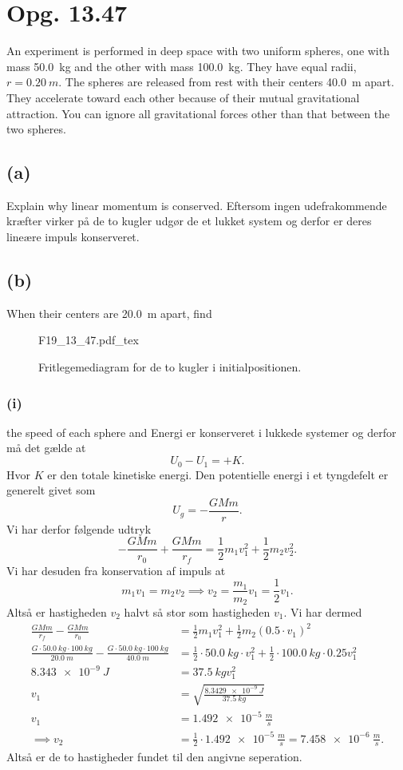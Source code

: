 \documentclass[12pt]{article}
\newcommand{\incfig}[2][1]{%
  \def\svgwidth{#1\columnwidth}
  {#2.pdf_tex}
}
\theoremstyle{definition}
\begin{document}
\section*{Opg. 13.47}
An experiment is performed in deep space with two uniform spheres, one with mass \qty{50,0}{kg} and the other with mass \qty{100,0}{kg}. They have equal radii, $r = \qty{0,20}{m}$. The spheres are released from rest with their centers \qty{40,0}{m} apart. They accelerate toward each other because of their mutual gravitational attraction. You can ignore all gravitational forces other than that between the two spheres.

\subsection*{(a)}
Explain why linear momentum is conserved.
\bigbreak
Eftersom ingen udefrakommende kræfter virker på de to kugler udgør de et lukket system og derfor er deres lineære impuls konserveret. 

\subsection*{(b)}
When their centers are \qty{20,0}{m} apart, find

\begin{figure}[ht]
  \centering
  \incfig[0.8]{F19_13_47}
  \caption{Fritlegemediagram for de to kugler i initialpositionen.}
  \label{fig:F19_13_47}
\end{figure}

\subsubsection*{(i)}
the speed of each sphere and
\bigbreak
Energi er konserveret i lukkede systemer og derfor må det gælde at
\[ 
  U_0 - U_1 = + K
.\]
Hvor $K$ er den totale kinetiske energi. Den potentielle energi i et tyngdefelt er generelt givet som
\[ 
  U_g = - \frac{GMm}{r}
.\]
Vi har derfor følgende udtryk
\[ 
  - \frac{GMm}{r_0} + \frac{GMm}{r_f} = \frac{1}{2}m_1 v_1^2 + \frac{1}{2} m_2 v_2^2
.\]
Vi har desuden fra konservation af impuls at
\[ 
m_1v_1 = m_2v_2 \implies v_2 = \frac{m_1}{m_2}v_1 = \frac{1}{2}v_1
.\]
Altså er hastigheden $v_2$ halvt så stor som hastigheden $v_1$. Vi har dermed
\begin{align*}
  \frac{GMm}{r_f} - \frac{GMm}{r_0} &= \frac{1}{2}m_1 v_1^2 + \frac{1}{2} m_2 (\num{0,5} \cdot  v_1)^2 \\
  \frac{G \cdot \qty{50,0}{kg} \cdot \qty{100}{kg} }{\qty{20,0}{m}} - \frac{G \cdot \qty{50,0}{kg} \cdot \qty{100}{kg} }{\qty{40,0}{m}} &= \frac{1}{2} \cdot \qty{50,0}{kg} \cdot v_1^2 + \frac{1}{2} \cdot \qty{100,0}{kg} \cdot \num{0,25} v_1^2 \\
  \qty{8,343e-9}{J} &= \qty{37,5}{kg} v_1^2 \\  
  v_1 &= \sqrt{\frac{\qty{8,3429e-9}{J}}{\qty{37,5}{kg}}} \\ 
  v_1 &= \qty{1,492e-5}{\frac{m}{s}} \\
  \implies v_2 &= \frac{1}{2} \cdot \qty{1,492e-5}{\frac{m}{s}} = \qty{7,458e-6}{\frac{m}{s}} 
.\end{align*}
Altså er de to hastigheder fundet til den angivne seperation.
\end{document}
